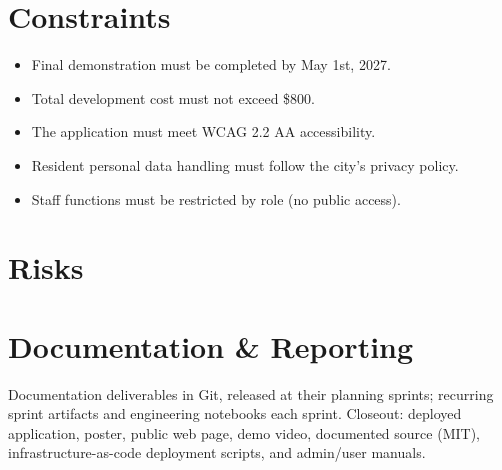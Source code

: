 \documentclass[11pt,letterpaper]{article}
\begin{document}
\section{Constraints}
\begin{itemize}
  \item Final demonstration must be completed by May 1st, 2027.
  \item Total development cost must not exceed \$800.
  \item The application must meet WCAG 2.2 AA accessibility.
  \item Resident personal data handling must follow the city's privacy policy.
  \item Staff functions must be restricted by role (no public access).
\end{itemize}

\section{Risks}
\begin{table}[h]
\caption{Highest-exposure project risks}
\end{table}

\section{Documentation \& Reporting}
Documentation deliverables in Git, released at their planning sprints; recurring
sprint artifacts and engineering notebooks each sprint. Closeout: deployed
application, poster, public web page, demo video, documented source (MIT),
infrastructure-as-code deployment scripts, and admin/user manuals.


{}
\end{document}
